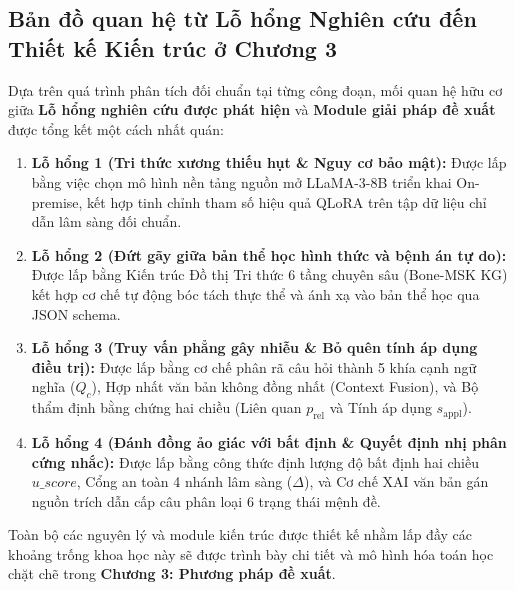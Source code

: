 \subsection{Bản đồ quan hệ từ Lỗ hổng Nghiên cứu đến Thiết kế Kiến trúc ở Chương 3}

Dựa trên quá trình phân tích đối chuẩn tại từng công đoạn, mối quan hệ hữu cơ giữa \textbf{Lỗ hổng nghiên cứu được phát hiện} và \textbf{Module giải pháp đề xuất} được tổng kết một cách nhất quán:

\begin{enumerate}
    \item \textbf{Lỗ hổng 1 (Tri thức xương thiếu hụt \& Nguy cơ bảo mật):} Được lấp bằng việc chọn mô hình nền tảng nguồn mở LLaMA-3-8B triển khai On-premise, kết hợp tinh chỉnh tham số hiệu quả QLoRA trên tập dữ liệu chỉ dẫn lâm sàng đối chuẩn.
    \item \textbf{Lỗ hổng 2 (Đứt gãy giữa bản thể học hình thức và bệnh án tự do):} Được lấp bằng Kiến trúc Đồ thị Tri thức 6 tầng chuyên sâu (Bone-MSK KG) kết hợp cơ chế tự động bóc tách thực thể và ánh xạ vào bản thể học qua JSON schema.
    \item \textbf{Lỗ hổng 3 (Truy vấn phẳng gây nhiễu \& Bỏ quên tính áp dụng điều trị):} Được lấp bằng cơ chế phân rã câu hỏi thành 5 khía cạnh ngữ nghĩa ($Q_c$), Hợp nhất văn bản không đồng nhất (Context Fusion), và Bộ thẩm định bằng chứng hai chiều (Liên quan $p_{\mathrm{rel}}$ và Tính áp dụng $s_{\mathrm{appl}}$).
    \item \textbf{Lỗ hổng 4 (Đánh đồng ảo giác với bất định \& Quyết định nhị phân cứng nhắc):} Được lấp bằng công thức định lượng độ bất định hai chiều $u\_score$, Cổng an toàn 4 nhánh lâm sàng ($\Delta$), và Cơ chế XAI văn bản gán nguồn trích dẫn cấp câu phân loại 6 trạng thái mệnh đề.
\end{enumerate}

\vspace{1em}
\noindent Toàn bộ các nguyên lý và module kiến trúc được thiết kế nhằm lấp đầy các khoảng trống khoa học này sẽ được trình bày chi tiết và mô hình hóa toán học chặt chẽ trong \textbf{Chương 3: Phương pháp đề xuất}.
